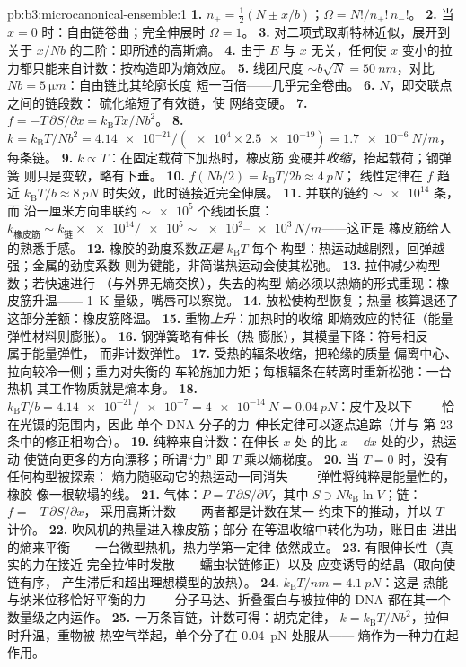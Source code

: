 \begin{solution}{pb:b3:microcanonical-ensemble:1}
\textbf{1.} $n_\pm = \tfrac12(N \pm x/b)$；$\Omega =
N!/n_+!\,n_-!$。
\textbf{2.} 当 $x = 0$ 时：自由链卷曲；完全伸展时
 $\Omega = 1$。
\textbf{3.} 对二项式取斯特林近似，展开到关于
$x/Nb$ 的二阶：即所述的高斯熵。
\textbf{4.} 由于 $E$ 与 $x$ 无关，任何使
$x$ 变小的拉力都只能来自计数：按构造即为熵效应。
\textbf{5.} 线团尺度 $\sim b\sqrt N = \qty{50}{nm}$，对比 $Nb =
\qty{5}{\micro m}$：自由链比其轮廓长度
短一百倍——几乎完全卷曲。
\textbf{6.} $N$，即交联点之间的链段数：
硫化缩短了有效链，使
网络变硬。
\textbf{7.} $f = -T\,\partial S/\partial x =
k_{\text{B}}Tx/Nb^2$。
\textbf{8.} $k = k_{\text{B}}T/Nb^2 = \num{4.14e-21}/(\num{e4}
\times \num{2.5e-19}) = \qty{1.7e-6}{N/m}$，每条链。
\textbf{9.} $k \propto T$：在固定载荷下加热时，橡皮筋
变硬并\emph{收缩}，抬起载荷；钢弹簧
则只是变软，略有下垂。
\textbf{10.} $f(Nb/2) = k_{\text{B}}T/2b \approx \qty{4}{pN}$；
线性定律在 $f$ 趋近 $k_{\text{B}}T/b \approx
\qty{8}{pN}$ 时失效，此时链接近完全伸展。
\textbf{11.} 并联的链约 $\sim\num{e14}$ 条，而
沿一厘米方向串联约 $\sim\num{e5}$ 个线团长度：
$k_{\text{橡皮筋}} \sim k_{\text{链}} \times \num{e14}/\num{e5}
\sim \num{e2}$--$\num{e3}\,\unit{N/m}$——这正是
橡皮筋给人的熟悉手感。
\textbf{12.} 橡胶的劲度系数\emph{正是} $k_{\text{B}}T$ 每个
构型：热运动越剧烈，回弹越强；金属的劲度系数
则为键能，非简谐热运动会使其松弛。
\textbf{13.} 拉伸减少构型数；若快速进行
（与外界无熵交换），失去的构型
熵必须以热熵的形式重现：橡皮筋升温——
\qty{1}{K} 量级，嘴唇可以察觉。
\textbf{14.} 放松使构型恢复；热量
核算退还了这部分差额：橡皮筋降温。
\textbf{15.} 重物\emph{上升}：加热时的收缩
即熵效应的特征（能量弹性材料则膨胀）。
\textbf{16.} 钢弹簧略有伸长（热
膨胀），其模量下降：符号相反——属于能量弹性，
而非计数弹性。
\textbf{17.} 受热的辐条收缩，把轮缘的质量
偏离中心、拉向较冷一侧；重力对失衡的
车轮施加力矩；每根辐条在转离时重新松弛：一台热机
其工作物质就是熵本身。
\textbf{18.} $k_{\text{B}}T/b = \num{4.14e-21}/\num{e-7} =
\qty{4e-14}{N} = \qty{0.04}{pN}$：皮牛及以下——
恰在光镊的范围内，因此
单个 DNA 分子的力–伸长定律可以逐点追踪（并与
第 23 条中的修正相吻合）。
\textbf{19.} 纯粹来自计数：在伸长 $x$ 处
的比 $x - \dd x$ 处的少，热运动
使链向更多的方向漂移；所谓“力”
即 $T$ 乘以熵梯度。
\textbf{20.} 当 $T = 0$ 时，没有任何构型被探索：
熵力随驱动它的热运动一同消失——
弹性将纯粹是能量性的，橡胶
像一根软塌的线。
\textbf{21.} 气体：$P = T\,\partial S/\partial V$，其中 $S \ni
Nk_{\text{B}}\ln V$；链：$f = -T\,\partial S/\partial x$，
采用高斯计数——两者都是计数在某一
约束下的推动，并以 $T$ 计价。
\textbf{22.} 吹风机的热量进入橡皮筋；部分
在等温收缩中转化为功，账目由
进出的熵来平衡——一台微型热机，热力学第一定律
依然成立。
\textbf{23.} 有限伸长性（真实的力在接近
完全拉伸时发散——蠕虫状链修正）以及
应变诱导的结晶（取向使链有序，
产生滞后和超出理想模型的放热）。
\textbf{24.} $k_{\text{B}}T/\unit{nm} = \qty{4.1}{pN}$：这是
热能与纳米位移恰好平衡的力——
分子马达、折叠蛋白与被拉伸的 DNA
都在其一个数量级之内运作。
\textbf{25.} 一万条盲链，计数可得：胡克定律，
$k = k_{\text{B}}T/Nb^2$，拉伸时升温，重物被
热空气举起，单个分子在 \qty{0.04}{pN} 处服从——
熵作为一种力在起作用。
\end{solution}
